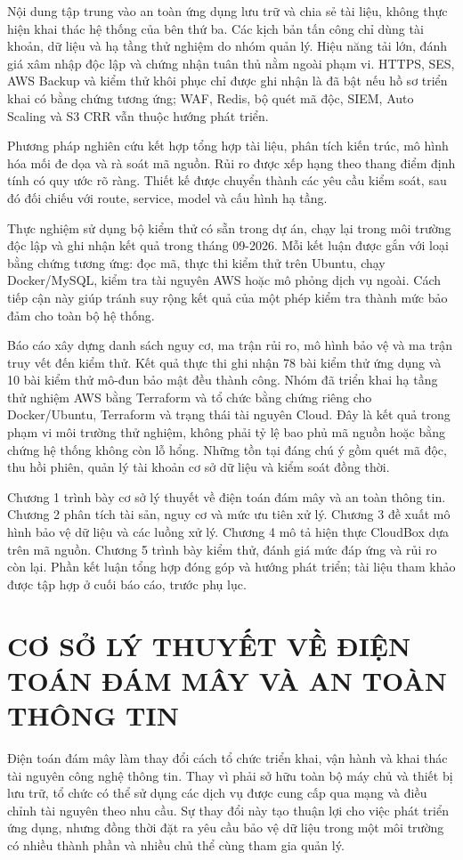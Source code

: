 Nội dung tập trung vào an toàn ứng dụng lưu trữ và chia sẻ tài liệu, không thực hiện khai thác hệ thống của bên thứ ba. Các kịch bản tấn công chỉ dùng tài khoản, dữ liệu và hạ tầng thử nghiệm do nhóm quản lý. Hiệu năng tải lớn, đánh giá xâm nhập độc lập và chứng nhận tuân thủ nằm ngoài phạm vi. HTTPS, SES, AWS Backup và kiểm thử khôi phục chỉ được ghi nhận là đã bật nếu hồ sơ triển khai có bằng chứng tương ứng; WAF, Redis, bộ quét mã độc, SIEM, Auto Scaling và S3 CRR vẫn thuộc hướng phát triển.

Phương pháp nghiên cứu kết hợp tổng hợp tài liệu, phân tích kiến trúc, mô hình hóa mối đe dọa và rà soát mã nguồn. Rủi ro được xếp hạng theo thang điểm định tính có quy ước rõ ràng. Thiết kế được chuyển thành các yêu cầu kiểm soát, sau đó đối chiếu với route, service, model và cấu hình hạ tầng.

Thực nghiệm sử dụng bộ kiểm thử có sẵn trong dự án, chạy lại trong môi trường độc lập và ghi nhận kết quả trong tháng 09-2026. Mỗi kết luận được gắn với loại bằng chứng tương ứng: đọc mã, thực thi kiểm thử trên Ubuntu, chạy Docker/MySQL, kiểm tra tài nguyên AWS hoặc mô phỏng dịch vụ ngoài. Cách tiếp cận này giúp tránh suy rộng kết quả của một phép kiểm tra thành mức bảo đảm cho toàn bộ hệ thống.

Báo cáo xây dựng danh sách nguy cơ, ma trận rủi ro, mô hình bảo vệ và ma trận truy vết đến kiểm thử. Kết quả thực thi ghi nhận 78 bài kiểm thử ứng dụng và 10 bài kiểm thử mô-đun bảo mật đều thành công. Nhóm đã triển khai hạ tầng thử nghiệm AWS bằng Terraform và tổ chức bằng chứng riêng cho Docker/Ubuntu, Terraform và trạng thái tài nguyên Cloud. Đây là kết quả trong phạm vi môi trường thử nghiệm, không phải tỷ lệ bao phủ mã nguồn hoặc bằng chứng hệ thống không còn lỗ hổng. Những tồn tại đáng chú ý gồm quét mã độc, thu hồi phiên, quản lý tài khoản cơ sở dữ liệu và kiểm soát đồng thời.

Chương 1 trình bày cơ sở lý thuyết về điện toán đám mây và an toàn thông tin. Chương 2 phân tích tài sản, nguy cơ và mức ưu tiên xử lý. Chương 3 đề xuất mô hình bảo vệ dữ liệu và các luồng xử lý. Chương 4 mô tả hiện thực CloudBox dựa trên mã nguồn. Chương 5 trình bày kiểm thử, đánh giá mức đáp ứng và rủi ro còn lại. Phần kết luận tổng hợp đóng góp và hướng phát triển; tài liệu tham khảo được tập hợp ở cuối báo cáo, trước phụ lục.
\clearpage
\chapter{CƠ SỞ LÝ THUYẾT VỀ ĐIỆN TOÁN ĐÁM MÂY VÀ AN TOÀN THÔNG TIN}
\label{chap:cosolythuyet}
Điện toán đám mây làm thay đổi cách tổ chức triển khai, vận hành và khai thác tài nguyên công nghệ thông tin. Thay vì phải sở hữu toàn bộ máy chủ và thiết bị lưu trữ, tổ chức có thể sử dụng các dịch vụ được cung cấp qua mạng và điều chỉnh tài nguyên theo nhu cầu. Sự thay đổi này tạo thuận lợi cho việc phát triển ứng dụng, nhưng đồng thời đặt ra yêu cầu bảo vệ dữ liệu trong một môi trường có nhiều thành phần và nhiều chủ thể cùng tham gia quản lý.

